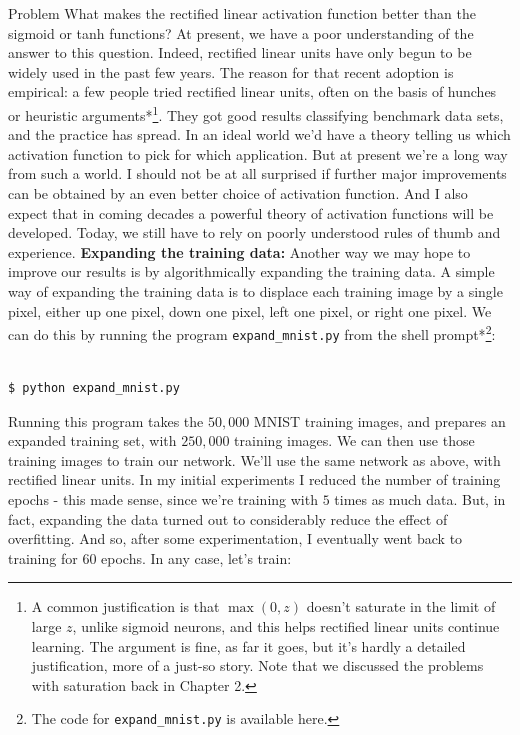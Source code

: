 \begin{exerciseBox}{Problem}
What makes the rectified linear activation function better than the sigmoid or tanh functions? At present, we have a poor understanding of the answer to this question. Indeed, rectified linear units have only begun to be widely used in the past few years. The reason for that recent adoption is empirical: a few people tried rectified linear units, often on the basis of hunches or heuristic arguments*\footnote{A common justification is that $\max(0, z)$ doesn't saturate in the limit of large $z$, unlike sigmoid neurons, and this helps rectified linear units continue learning. The argument is fine, as far it goes, but it's hardly a detailed justification, more of a just-so story. Note that we discussed the problems with saturation back in Chapter 2.}. They got good results classifying benchmark data sets, and the practice has spread. In an ideal world we'd have a theory telling us which activation function to pick for which application. But at present we're a long way from such a world. I should not be at all surprised if further major improvements can be obtained by an even better choice of activation function. And I also expect that in coming decades a powerful theory of activation functions will be developed. Today, we still have to rely on poorly understood rules of thumb and experience. \textbf{Expanding the training data:} Another way we may hope to improve our results is by algorithmically expanding the training data. A simple way of expanding the training data is to displace each training image by a single pixel, either up one pixel, down one pixel, left one pixel, or right one pixel. We can do this by running the program \texttt{expand\_\allowbreak{}mnist.py} from the shell prompt*\footnote{The code for \texttt{expand\_\allowbreak{}mnist.py} is available here.}:



\begin{lstlisting}
 
$ python expand_mnist.py

\end{lstlisting}


Running this program takes the $50,000$ MNIST training images, and prepares an expanded training set, with $250,000$ training images. We can then use those training images to train our network. We'll use the same network as above, with rectified linear units. In my initial experiments I reduced the number of training epochs - this made sense, since we're training with $5$ times as much data. But, in fact, expanding the data turned out to considerably reduce the effect of overfitting. And so, after some experimentation, I eventually went back to training for $60$ epochs. In any case, let's train:




\end{exerciseBox}
